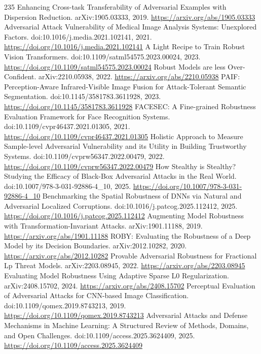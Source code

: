 \documentclass[11pt]{article}
\begin{document}
\begin{thebibliography}{235}
 Enhancing Cross-task Transferability of Adversarial Examples with Dispersion Reduction. arXiv:1905.03333, 2019. \url{https://arxiv.org/abs/1905.03333}
 Adversarial Attack Vulnerability of Medical Image Analysis Systems: Unexplored Factors. doi:10.1016/j.media.2021.102141, 2021. \url{https://doi.org/10.1016/j.media.2021.102141}
 A Light Recipe to Train Robust Vision Transformers. doi:10.1109/satml54575.2023.00024, 2023. \url{https://doi.org/10.1109/satml54575.2023.00024}
 Robust Models are less Over-Confident. arXiv:2210.05938, 2022. \url{https://arxiv.org/abs/2210.05938}
 PAIF: Perception-Aware Infrared-Visible Image Fusion for Attack-Tolerant Semantic Segmentation. doi:10.1145/3581783.3611928, 2023. \url{https://doi.org/10.1145/3581783.3611928}
 FACESEC: A Fine-grained Robustness Evaluation Framework for Face Recognition Systems. doi:10.1109/cvpr46437.2021.01305, 2021. \url{https://doi.org/10.1109/cvpr46437.2021.01305}
 Holistic Approach to Measure Sample-level Adversarial Vulnerability and its Utility in Building Trustworthy Systems. doi:10.1109/cvprw56347.2022.00479, 2022. \url{https://doi.org/10.1109/cvprw56347.2022.00479}
 How Stealthy is Stealthy? Studying the Efficacy of Black-Box Adversarial Attacks in the Real World. doi:10.1007/978-3-031-92886-4\_10, 2025. \url{https://doi.org/10.1007/978-3-031-92886-4_10}
 Benchmarking the Spatial Robustness of DNNs via Natural and Adversarial Localized Corruptions. doi:10.1016/j.patcog.2025.112412, 2025. \url{https://doi.org/10.1016/j.patcog.2025.112412}
 Augmenting Model Robustness with Transformation-Invariant Attacks. arXiv:1901.11188, 2019. \url{https://arxiv.org/abs/1901.11188}
 ROBY: Evaluating the Robustness of a Deep Model by its Decision Boundaries. arXiv:2012.10282, 2020. \url{https://arxiv.org/abs/2012.10282}
 Provable Adversarial Robustness for Fractional Lp Threat Models. arXiv:2203.08945, 2022. \url{https://arxiv.org/abs/2203.08945}
 Evaluating Model Robustness Using Adaptive Sparse L0 Regularization. arXiv:2408.15702, 2024. \url{https://arxiv.org/abs/2408.15702}
 Perceptual Evaluation of Adversarial Attacks for CNN-based Image Classification. doi:10.1109/qomex.2019.8743213, 2019. \url{https://doi.org/10.1109/qomex.2019.8743213}
 Adversarial Attacks and Defense Mechanisms in Machine Learning: A Structured Review of Methods, Domains, and Open Challenges. doi:10.1109/access.2025.3624409, 2025. \url{https://doi.org/10.1109/access.2025.3624409}

\end{thebibliography}
\end{document}
